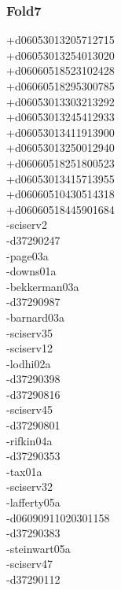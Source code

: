 \begin{multicols}{4}
\subsubsection*{Fold7}
+d06053013205712715\\
+d06053013254013020\\
+d06060518523102428\\
+d06060518295300785\\
+d06053013303213292\\
+d06053013245412933\\
+d06053013411913900\\
+d06053013250012940\\
+d06060518251800523\\
+d06053013415713955\\
+d06060510430514318\\
+d06060518445901684\\
-sciserv2\\
-d37290247\\
-page03a\\
-downs01a\\
-bekkerman03a\\
-d37290987\\
-barnard03a\\
-sciserv35\\
-sciserv12\\
-lodhi02a\\
-d37290398\\
-d37290816\\
-sciserv45\\
-d37290801\\
-rifkin04a\\
-d37290353\\
-tax01a\\
-sciserv32\\
-lafferty05a\\
-d06090911020301158\\
-d37290383\\
-steinwart05a\\
-sciserv47\\
-d37290112\\

\end{multicols}
